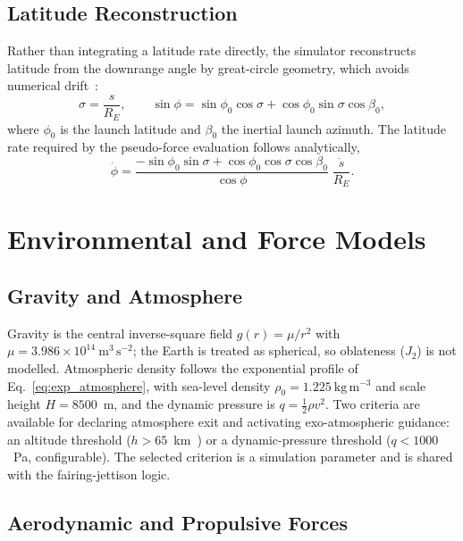 \subsection{Latitude Reconstruction}
\label{ssec:latitude}

Rather than integrating a latitude rate directly, the simulator reconstructs
latitude from the downrange angle by great-circle geometry, which avoids
numerical drift~\cite{BateMuellerWhite1971Fundamentals}:
\begin{equation}
  \sigma = \frac{s}{R_E}, \qquad
  \sin\phi = \sin\phi_0\cos\sigma + \cos\phi_0\sin\sigma\cos\beta_0,
  \label{eq:lat_recon}
\end{equation}
where $\phi_0$ is the launch latitude and $\beta_0$ the inertial launch azimuth.
The latitude rate required by the pseudo-force evaluation follows analytically,
\begin{equation}
  \dot\phi = \frac{-\sin\phi_0\sin\sigma
    + \cos\phi_0\cos\sigma\cos\beta_0}{\cos\phi}\;\frac{\dot s}{R_E}.
  \label{eq:phidot}
\end{equation}

\section{Environmental and Force Models}
\label{sec:models}

\subsection{Gravity and Atmosphere}
\label{ssec:gravity_atm}

Gravity is the central inverse-square field $g(r)=\mu/r^{2}$ with
$\mu=3.986\times10^{14}~\mathrm{m^{3}\,s^{-2}}$; the Earth is treated as
spherical, so oblateness ($J_2$) is not modelled. Atmospheric density follows the
exponential profile of Eq.~\eqref{eq:exp_atmosphere}, with sea-level density
$\rho_0=1.225~\mathrm{kg\,m^{-3}}$ and scale height $H=8500$~m, and the dynamic
pressure is $q=\tfrac12\rho v^{2}$. Two criteria are available for declaring
atmosphere exit and activating exo-atmospheric guidance: an altitude threshold
($h>65$~km~\cite{kluever2018space}) or a dynamic-pressure threshold
($q<1000$~Pa, configurable). The selected criterion is a simulation parameter and
is shared with the fairing-jettison logic.

\subsection{Aerodynamic and Propulsive Forces}
\label{ssec:aero_prop}

